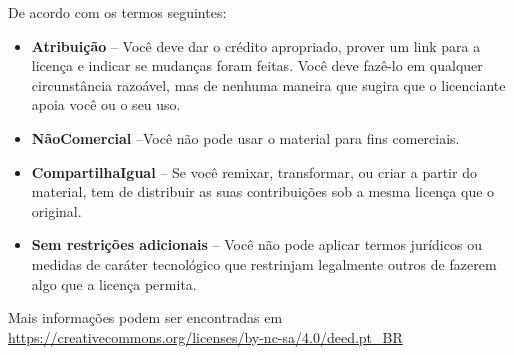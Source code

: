 \documentclass{article}
\begin{document}
De acordo com os termos seguintes:
\begin{itemize}
\item \textbf{Atribuição} -- Você deve dar o crédito apropriado, prover um link para a licença e indicar se mudanças foram feitas. Você deve fazê-lo em qualquer circunstância razoável, mas de nenhuma maneira que sugira que o licenciante apoia você ou o seu uso.
\item \textbf{NãoComercial} --Você não pode usar o material para fins comerciais.
\item \textbf{CompartilhaIgual} -- Se você remixar, transformar, ou criar a partir do material, tem de distribuir as suas contribuições sob a mesma licença que o original.
\item \textbf{Sem restrições adicionais} -- Você não pode aplicar termos jurídicos ou medidas de caráter tecnológico que restrinjam legalmente outros de fazerem algo que a licença permita.
\end{itemize}

Mais informações podem ser encontradas em \url{https://creativecommons.org/licenses/by-nc-sa/4.0/deed.pt_BR}
\end{document}
